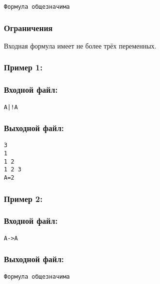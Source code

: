 \documentclass[11pt,a4paper,oneside]{article}
\begin{document}
\begin{verbatim}
Формула общезначима
\end{verbatim}

\subsubsection*{Ограничения}
Входная формула имеет не более трёх переменных.

\subsubsection*{Пример 1:}
\begin{minipage}[t]{.5\textwidth}
\subsubsection*{Входной файл:}
\begin{verbatim}
A|!A
\end{verbatim}
\end{minipage}
\begin{minipage}[t]{.5\textwidth}
\subsubsection*{Выходной файл:}
\begin{verbatim}
3
1
1 2
1 2 3
A=2
\end{verbatim}
\end{minipage}

\subsubsection*{Пример 2:}
\begin{minipage}[t]{.5\textwidth}
\subsubsection*{Входной файл:}
\begin{verbatim}
A->A
\end{verbatim}
\end{minipage}
\begin{minipage}[t]{.5\textwidth}
\subsubsection*{Выходной файл:}
\begin{verbatim}
Формула общезначима
\end{verbatim}
\end{minipage}
\end{document}
